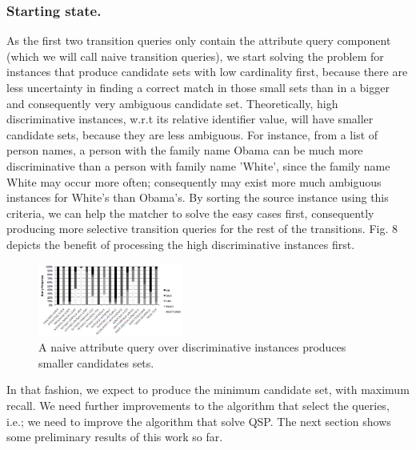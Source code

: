 \subsubsection{Starting state.} As the first two transition queries only contain the attribute query component (which we will call naive transition queries), we start solving the problem for instances that produce candidate sets with low cardinality first, because there are less uncertainty in finding a correct match in those small sets than in a bigger and consequently very ambiguous candidate set. Theoretically, high discriminative instances, w.r.t its relative identifier value, will have smaller candidate sets, because they are less ambiguous.  For instance, from a list of person names, a person with the family name Obama can be much more discriminative than a person with family name 'White', since the family name White may occur more often; consequently may exist more much ambiguous instances for White's than Obama's. By sorting the source instance using this criteria, we can help the matcher to solve the easy cases first, consequently producing more selective transition queries for the rest of the transitions. Fig. 8 depicts the benefit of processing the high discriminative instances first.

\begin{figure} 
\centering
\includegraphics[height=90px ]{p8.png}
\caption{A naive attribute query over discriminative instances produces smaller candidates sets.} 
\end{figure} 


In that fashion, we expect to produce the minimum candidate set, with maximum recall. We need further improvements to the algorithm that select the queries, i.e.; we need to improve the algorithm that solve QSP.  The next section shows some preliminary results of this work so far.

